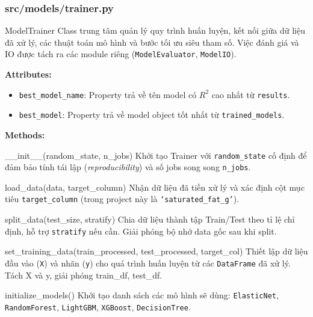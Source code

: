 \documentclass[12pt,a4paper]{article}
\newenvironment{methodlist}{
    \begin{description}[style=nextline, font=\ttfamily\color{sklearn-blue}]
}{
    \end{description}
}
\begin{document}
\subsubsection{src/models/trainer.py}

\begin{classbox}{ModelTrainer}
Class trung tâm quản lý quy trình huấn luyện, kết nối giữa dữ liệu đã xử lý, các thuật toán mô hình và bước tối ưu siêu tham số.
Việc đánh giá và IO được tách ra các module riêng (\texttt{ModelEvaluator}, \texttt{ModelIO}).

\vspace{0.2cm}
\textbf{Attributes:}
\begin{itemize}
    \item \texttt{best\_model\_name}: Property trả về tên model có $R^2$ cao nhất từ \texttt{results}.
    \item \texttt{best\_model}: Property trả về model object tốt nhất từ \texttt{trained\_models}.
\end{itemize}

\vspace{0.2cm}
\textbf{Methods:}
\begin{methodlist}
    \item[\_\_init\_\_(random\_state, n\_jobs)] 
    Khởi tạo Trainer với \texttt{random\_state} cố định để đảm bảo tính tái lập (\textit{reproducibility}) và số jobs song song \texttt{n\_jobs}.
    
    \item[load\_data(data, target\_column)] 
    Nhận dữ liệu đã tiền xử lý và xác định cột mục tiêu \texttt{target\_column} (trong project này là \texttt{`saturated\_fat\_g'}).
    
    \item[split\_data(test\_size, stratify)] 
    Chia dữ liệu thành tập Train/Test theo tỉ lệ chỉ định, hỗ trợ \texttt{stratify} nếu cần. Giải phóng bộ nhớ data gốc sau khi split.
    
    \item[set\_training\_data(train\_processed, test\_processed, target\_col)] 
    Thiết lập dữ liệu đầu vào (\texttt{X}) và nhãn (\texttt{y}) cho quá trình huấn luyện từ các \texttt{DataFrame} đã xử lý. Tách X và y, giải phóng train\_df, test\_df.
    
    \item[initialize\_models()] 
    Khởi tạo danh sách các mô hình sẽ dùng: \texttt{ElasticNet}, \texttt{RandomForest}, \texttt{LightGBM}, \texttt{XGBoost}, \texttt{DecisionTree}.
    

\end{methodlist}
\end{classbox}
\end{document}
